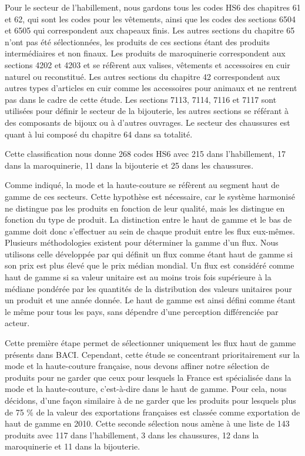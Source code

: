 \documentclass[french,10pt,a4paper]{article}
\begin{document}
Pour le secteur de l'habillement, nous gardons tous les codes HS6 des chapitres 61 et 62, qui sont les codes pour les vêtements, ainsi que les codes des sections 6504 et 6505 qui correspondent aux chapeaux finis. Les autres sections du chapitre 65 n'ont pas été sélectionnées, les produits de ces sections étant des produits intermédiaires et non finaux. Les produits de maroquinerie correspondent aux sections 4202 et 4203 et se réfèrent aux valises, vêtements et accessoires en cuir naturel ou reconstitué. Les autres sections du chapitre 42 correspondent aux autres types d'articles en cuir comme les accessoires pour animaux et ne rentrent pas dans le cadre de cette étude. Les sections 7113, 7114, 7116 et 7117 sont utilisées pour définir le secteur de la bijouterie, les autres sections se référant à des composants de bijoux ou à d'autres ouvrages. Le secteur des chaussures est quant à lui composé du chapitre 64 dans sa totalité.

Cette classification nous donne 268 codes HS6 avec 215 dans l'habillement, 17 dans la maroquinerie, 11 dans la bijouterie et 25 dans les chaussures. 

Comme indiqué, la mode et la haute-couture se réfèrent au segment haut de gamme de ces secteurs. Cette hypothèse est nécessaire, car le système harmonisé ne distingue pas les produits en fonction de leur qualité, mais les distingue en fonction du type de produit. La distinction entre le haut de gamme et le bas de gamme doit donc s'effectuer au sein de chaque produit entre les flux eux-mêmes. Plusieurs méthodologies existent pour déterminer la gamme d'un flux. Nous utilisons celle développée par \cite{Fontagne1997} qui définit un flux comme étant haut de gamme si son \og prix\fg{} est plus élevé que le \og prix\fg{} médian mondial. Un flux est considéré comme haut de gamme si sa valeur unitaire est au moins trois fois supérieure à la médiane pondérée par les quantités de la distribution des valeurs unitaires pour un produit et une année donnée. Le haut de gamme est ainsi défini comme étant le même pour tous les pays, sans dépendre d'une perception différenciée par acteur.

Cette première étape permet de sélectionner uniquement les flux haut de gamme présents dans BACI. Cependant, cette étude se concentrant prioritairement sur la mode et la haute-couture française, nous devons affiner notre sélection de produits pour ne garder que ceux pour lesquels la France est spécialisée dans la mode et la haute-couture, c'est-à-dire dans le haut de gamme. Pour cela, nous décidons, d'une façon similaire à \cite{Martin2015} de ne garder que les produits pour lesquels plus de 75 \% de la valeur des exportations françaises est classée comme exportation de haut de gamme en 2010. Cette seconde sélection nous amène à une liste de 143 produits avec 117 dans l'habillement, 3 dans les chaussures, 12 dans la maroquinerie et 11 dans la bijouterie.
\end{document}
